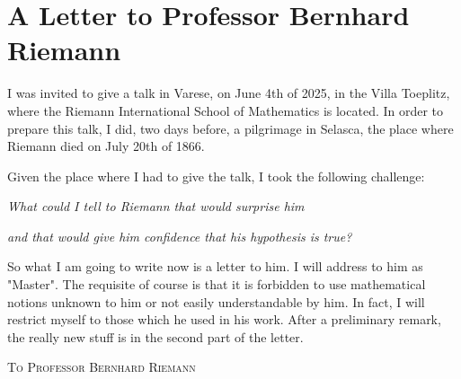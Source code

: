 \documentclass{article}
\begin{document}
\newpage
\section{ A Letter to Professor Bernhard Riemann}
 I was invited to give a talk in Varese, on June 4th of 2025, in the Villa Toeplitz, where  the Riemann International School of Mathematics is located. In order to prepare this talk, I did, two days before, a pilgrimage in Selasca,  the place where Riemann died on  July 20th of 1866. 

Given the place where I had to give the talk, I took the following challenge:

\medskip
\centerline{\it What could I tell to Riemann that would surprise him} \centerline{\it and that would give him confidence that his hypothesis is true?}
\medskip
 So what I am going to write now is a letter to him. I will address to him as "Master". The requisite of course is that it is forbidden to use mathematical  notions unknown to him or  not  easily understandable by him. In fact, I will restrict myself  to those which he  used in his work. After a  preliminary remark, the really new stuff is in the second part of the letter. 
 \bigskip
 \begingroup
\newenvironment{ancientletter}{%
  \fontfamily{ppl}\selectfont Palatino
  \setlength{\parindent}{1em}
  \setlength{\parskip}{0.5em}
  \large %
}{%
  \normalfont\normalsize
}

 
 \begin{center}
{\Large\scshape To Professor Bernhard Riemann}
\end{center}
 
\end{document}
